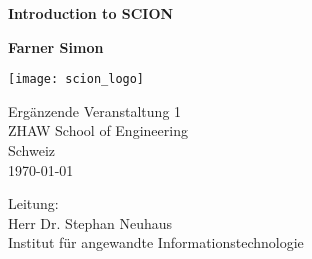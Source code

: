 \begin{titlepage}
    \thispagestyle{frontpage}
    \begin{center}

        \vspace*{3cm}
        
        \Huge
        \textbf{Introduction to SCION}
        
        \vspace{0.5cm}
        
        
        \vspace{1.5cm}
        
        \textbf{Farner Simon}

        \vfill

        \texttt{[image: scion\_logo]}
        \vfill

        \begin{minipage}[t]{0.4\textwidth}
        \normalsize
        Ergänzende Veranstaltung 1 \\
        ZHAW School of Engineering \\
        Schweiz\\
        \today
        \end{minipage}
        \begin{minipage}[t]{0.4\textwidth}
        \normalsize
        \raggedright
        Leitung:\\
        Herr Dr. Stephan Neuhaus \\
        Institut für angewandte Informations­technologie\\
        \end{minipage}

    \end{center}
\end{titlepage}

